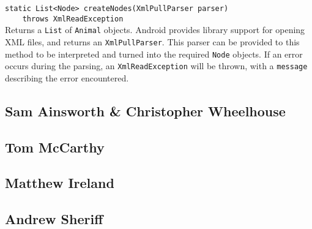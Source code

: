 \documentclass[12pt,a4paper,twoside]{article}
\begin{document}
\verb|static List<Node> createNodes(XmlPullParser parser)|\\
\verb|    throws XmlReadException|\\
Returns a \verb|List| of \verb|Animal| objects. Android provides library support for opening XML files, and returns an \verb|XmlPullParser|. This parser can be provided to this method to be interpreted and turned into the required \verb|Node| objects. If an error occurs during the parsing, an \verb|XmlReadException| will be thrown, with a \verb|message| describing the error encountered.

\subsection{Sam Ainsworth \& Christopher Wheelhouse}

\subsection{Tom McCarthy}

\subsection{Matthew Ireland}

\subsection{Andrew Sheriff}
\end{document}
